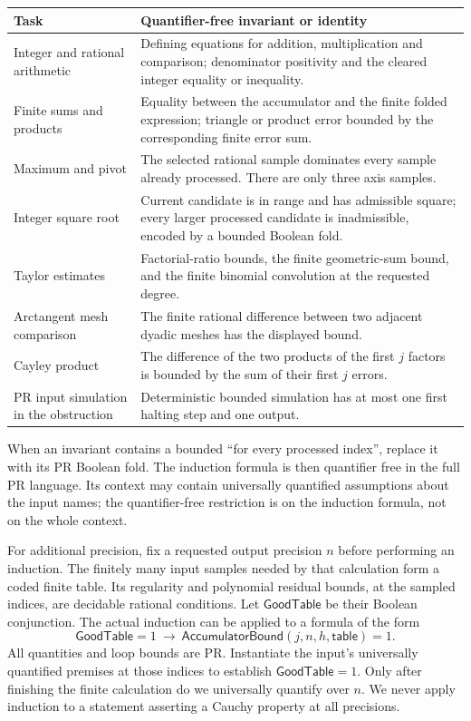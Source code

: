 \begin{longtable}{@{}p{}p{}@{}}
\toprule
Task & Quantifier-free invariant or identity \\
\midrule
\endhead
Integer and rational arithmetic & Defining equations for addition,
multiplication and comparison; denominator positivity and the cleared
integer equality or inequality.\\[3pt]
Finite sums and products & Equality between the accumulator and the
finite folded expression; triangle or product error bounded by the
corresponding finite error sum.\\[3pt]
Maximum and pivot & The selected rational sample dominates every sample
already processed. There are only three axis samples.\\[3pt]
Integer square root & Current candidate is in range and has admissible
square; every larger processed candidate is inadmissible, encoded by
a bounded Boolean fold.\\[3pt]
Taylor estimates & Factorial-ratio bounds, the finite geometric-sum
bound, and the finite binomial convolution at the requested degree.\\[3pt]
Arctangent mesh comparison & The finite rational difference between
two adjacent dyadic meshes has the displayed bound.\\[3pt]
Cayley product & The difference of the two products of the first $j$
factors is bounded by the sum of their first $j$ errors.\\[3pt]
PR input simulation in the obstruction & Deterministic bounded
simulation has at most one first halting step and one output.\\
\bottomrule
\end{longtable}

When an invariant contains a bounded ``for every processed index'',
replace it with its PR Boolean fold. The induction formula is then
quantifier free in the full PR language. Its context may contain
universally quantified assumptions about the input names; the
quantifier-free restriction is on the induction formula, not on the
whole context.

For additional precision, fix a requested output precision $n$ before
performing an induction. The finitely many input samples needed by that
calculation form a coded finite table. Its regularity and polynomial
residual bounds, at the sampled indices, are decidable rational
conditions. Let $\mathsf{GoodTable}$ be their Boolean conjunction. The
actual induction can be applied to a formula of the form
\[
 \mathsf{GoodTable}=1\ \longrightarrow\
 \mathsf{AccumulatorBound}(j,n,h,\mathsf{table})=1.
\]
All quantities and loop bounds are PR. Instantiate the input's
universally quantified premises at those indices to establish
$\mathsf{GoodTable}=1$. Only after finishing the finite calculation do
we universally quantify over $n$. We never apply induction to a
statement asserting a Cauchy property at all precisions.

